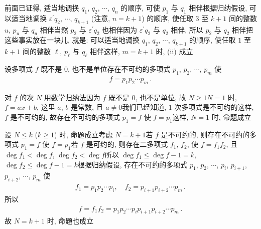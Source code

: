 \begin{pf}
    前面已证得, 适当地调换 $q_1$, $q_2$, $\cdots$, $q_n$ 的顺序, 可使 $p_1$ 与 $q_1$ 相伴\period 根据归纳假设, 可以适当地调换 $\varepsilon^{\prime} q_2$, $\cdots$, $q_{k+1}$ (注意, $n = k+1$) 的顺序, 使任取 $3$ 至 $k+1$ 间的整数 $u$, $p_u$ 与 $q_u$ 相伴\period 当然 $p_2$ 与 $\varepsilon^{\prime} q_2$ 也相伴\period 因为 $\varepsilon^{\prime} q_2$ 与 $q_2$ 相伴, 所以 $p_2$ 与 $q_2$ 相伴\period 把这些事实放在一块儿, 就是: 可以适当地调换 $q_1$, $q_2$, $\cdots$, $q_{k+1}$ 的顺序, 使任取 $1$ 至 $k+1$ 间的整数 $\ell$, $p_{\ell}$ 与 $q_{\ell}$ 相伴\period 这样, $m = k+1$ 时, (ii) 成立\period
\end{pf}

\begin{proposition}
    设多项式 $f$ 既不是 $0$, 也不是单位\period 存在不可约的多项式 $p_1$, $p_2$, $\cdots$, $p_m$ 使
    \begin{align*}
        f = p_1 p_2 \cdots p_m \period
    \end{align*}
\end{proposition}

\begin{pf}
    对 $f$ 的次 $N$ 用数学归纳法\period 因为 $f$ 既不是 $0$, 也不是单位, 故 $N \geq 1$\period $N = 1$ 时, $f = ax + b$, 这里 $a$, $b$ 是常数, 且 $a \neq 0$\period 我们已经知道, $1$ 次多项式是不可约的\period 这样, $f$ 是不可约的, 故存在不可约的多项式 $p_1 = f$ 使 $f = p_1$\period 这样, $N = 1$ 时, 命题成立\period

    设 $N \leq k$ ($k \geq 1$) 时, 命题成立\period 考虑 $N = k+1$\period 若 $f$ 是不可约的, 则存在不可约的多项式 $p_1 = f$ 使 $f = p_1$\period 若 $f$ 是可约的, 则存在二多项式 $f_1$, $f_2$, 使 $f = f_1 f_2$, 且 $\deg f_1 < \deg f$, $\deg f_2 < \deg f$\period 所以 $\deg f_1 \leq \deg f - 1 = k$, $\deg f_2 \leq \deg f - 1 = k$\period 根据归纳假设, 存在不可约的多项式 $p_1$, $p_2$, $\cdots$, $p_i$, $p_{i+1}$, $p_{i+2}$, $\cdots$, $p_m$ 使
    \begin{align*}
        f_1 = p_1 p_2 \cdots p_i, \quad f_2 = p_{i+1} p_{i+2} \cdots p_m \period
    \end{align*}
    所以
    \begin{align*}
        f = f_1 f_2 = p_1 p_2 \cdots p_i p_{i+1} p_{i+2} \cdots p_m \period
    \end{align*}
    故 $N = k+1$ 时, 命题也成立\period
\end{pf}

